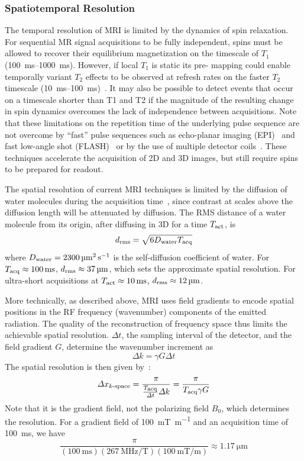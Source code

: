 \subsubsection{Spatiotemporal Resolution}

The temporal resolution of MRI is limited by the dynamics of spin relaxation. For sequential MR signal acquisitions to be fully independent, spins must be allowed to recover their equilibrium magnetization on the timescale of $T_1$ (\SIrange{100}{1000}{\milli\second}).
However, if local $T_1$ is static its pre- mapping could enable temporally variant $T_2$ effects to be observed at refresh rates on the faster $T_2$ timescale (\SIrange{10}{100}{\milli\second})~\cite{deichmann95}.
It may also be possible to detect events that occur on a timescale shorter than T1 and T2 if the magnitude of the resulting change in spin dynamics overcomes the lack of independence between acquisitions.
Note that these limitations on the repetition time of the underlying pulse sequence are not overcome by ``fast'' pulse sequences such as echo-planar imaging (EPI)~\cite{stehling91} and fast low-angle shot (FLASH)~\cite{haase86} or by the use of multiple detector coils~\cite{wiesinger06}.
These techniques accelerate the acquisition of 2D and 3D images, but still require spins to be prepared for readout.

The spatial resolution of current MRI techniques is limited by the diffusion of water molecules during the acquisition time~\cite{glover02}, since contrast at scales above the diffusion length will be attenuated by diffusion.
The RMS distance of a water molecule from its origin, after diffusing in 3D for a time $T_{\text{\scriptsize act}}$, is
\[d_{\text{\scriptsize rms}} = \sqrt{6D_{\text{\scriptsize water}}T_{\text{\scriptsize acq}}}\]
where $D_{\text{\scriptsize water}}=\SI{2300}{\micro\meter\squared\per\second}$ is the self-diffusion coefficient of water.
For $T_{\text{\scriptsize acq}}\approx\SI{100}{\milli\second}$, $d_{\text{\scriptsize rms}}\approx\SI{37}{\micro\meter}$, which sets the approximate spatial resolution.
For ultra-short acquisitions at $T_{\text{\scriptsize act}}\approx\SI{10}{\milli\second}$, $d_{\text{\scriptsize rms}}\approx\SI{12}{\micro\meter}$.

More technically, as described above, MRI uses field gradients to encode spatial positions in the RF frequency (wavenumber) components of the emitted radiation.
The quality of the reconstruction of frequency space thus limits the achievable spatial resolution.
$\Delta t$, the sampling interval of the detector, and the field gradient $G$, determine the wavenumber increment as
\[\Delta k = \gamma G \Delta t\]
The spatial resolution is then given by~\cite{glover02}:
\[\Delta x_{\text{\scriptsize $k$-space}} = \frac{\pi}{\frac{T_{\text{\scriptsize acq}}}{\Delta t} \Delta k} = \frac{\pi}{T_{\text{\scriptsize acq}} \gamma G}\]
Note that it is the gradient field, not the polarizing field $B_0$, which determines the resolution. For a gradient field of \SI{100}{\milli\tesla\per\meter} and an acquisition time of \SI{100}{\milli\second}, we have
\[\frac{\pi}{\left(\SI{100}{\milli\second}\right)\left(\SI{267}{\MHz\per\tesla}\right)\left(\SI{100}{\milli\tesla\per\meter}\right)}\approx \SI{1.17}{\micro\meter}\]

